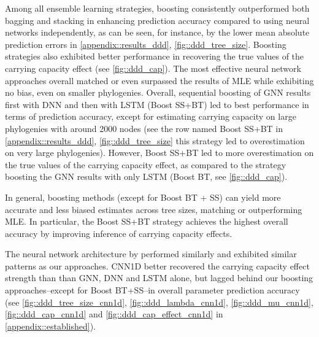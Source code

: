 {Among all ensemble learning strategies, boosting consistently outperformed both bagging and stacking in enhancing prediction accuracy compared to using neural networks independently, as can be seen, for instance, by the lower mean absolute prediction errors in \autoref{appendix::results_ddd}, \autoref{fig::ddd_tree_size}. Boosting strategies also exhibited better performance in recovering the true values of the carrying capacity effect (see \autoref{fig::ddd_cap}). The most effective neural network approaches overall matched or even surpassed the results of MLE while exhibiting no bias, even on smaller phylogenies. Overall, sequential boosting of GNN results first with DNN and then with LSTM (Boost SS+BT) led to best performance in terms of prediction accuracy, except for estimating carrying capacity on large phylogenies with around 2000 nodes (see the row named Boost SS+BT in \autoref{appendix::results_ddd}, \autoref{fig::ddd_tree_size} this strategy led to overestimation on very large phylogenies). However, Boost SS+BT led to more overestimation on the true values of the carrying capacity effect, as compared to the strategy boosting the GNN results with only LSTM (Boost BT, see \autoref{fig::ddd_cap}). 

In general, boosting methods (except for Boost BT + SS) can yield more accurate and less biased estimates across tree sizes, matching or outperforming MLE. In particular, the Boost SS+BT strategy achieves the highest overall accuracy by improving inference of carrying capacity effects.

The neural network architecture by \citet{voznica_deep_2022} performed similarly and exhibited similar patterns as our approaches. CNN1D better recovered the carrying capacity effect strength than than GNN, DNN and LSTM alone, but lagged behind our boosting approaches--except for Boost BT+SS--in overall parameter prediction accuracy (see \autoref{fig::ddd_tree_size_cnn1d}, \autoref{fig::ddd_lambda_cnn1d}, \autoref{fig::ddd_mu_cnn1d}, \autoref{fig::ddd_cap_cnn1d} and \autoref{fig::ddd_cap_effect_cnn1d} in \autoref{appendix::established}).

}
